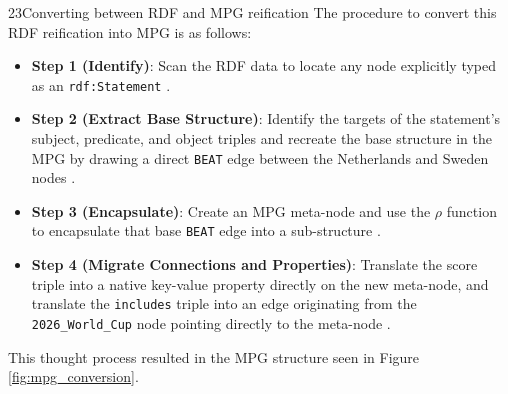 \begin{question}{2}{3}{Converting between RDF and MPG reification}
The procedure to convert this RDF reification into MPG is as follows:
\begin{itemize}
    \item \textbf{Step 1 (Identify)}: Scan the RDF data to locate any node explicitly typed as an \texttt{rdf:Statement} \cite{hernandez_reifying_nodate}.
    \item \textbf{Step 2 (Extract Base Structure)}: Identify the targets of the statement's subject, predicate, and object triples and recreate the base structure in the MPG by drawing a direct \texttt{BEAT} edge between the Netherlands and Sweden nodes \cite{sadoughi_meta-property_2025}.
    \item \textbf{Step 3 (Encapsulate)}: Create an MPG meta-node and use the $\rho$ function to encapsulate that base \texttt{BEAT} edge into a sub-structure \cite{sadoughi_meta-property_2025}.
    \item \textbf{Step 4 (Migrate Connections and Properties)}: Translate the score triple into a native key-value property directly on the new meta-node, and translate the \texttt{includes} triple into an edge originating from the \texttt{2026\_World\_Cup} node pointing directly to the meta-node \cite{sadoughi_meta-property_2025}.
\end{itemize}

This thought process resulted in the MPG structure seen in Figure \ref{fig:mpg_conversion}.

\begin{figure}[htbp]
\centering
{}
\end{figure}
\end{question}
